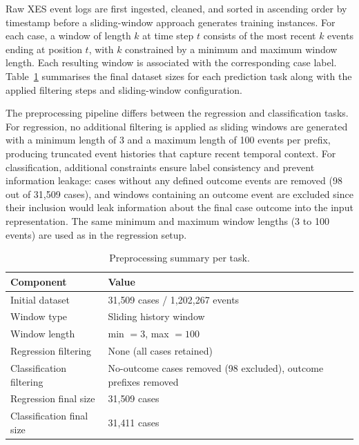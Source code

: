 \documentclass[runningheads]{llncs}
\begin{document}
Raw XES event logs are first ingested, cleaned, and sorted in ascending order by timestamp before a sliding-window approach generates training instances. For each case, a window of length $k$ at time step $t$ consists of the most recent $k$ events ending at position $t$, with $k$ constrained by a minimum and maximum window length. Each resulting window is associated with the corresponding case label. Table~\ref{tab:preprocessing-summary} summarises the final dataset sizes for each prediction task along with the applied filtering steps and sliding-window configuration. 

The preprocessing pipeline differs between the regression and classification tasks. For regression, no additional filtering is applied as sliding windows are generated with a minimum length of 3 and a maximum length of 100 events per prefix, producing truncated event histories that capture recent temporal context. For classification, additional constraints ensure label consistency and prevent information leakage: cases without any defined outcome events are removed (98 out of 31,509 cases), and windows containing an outcome event are excluded since their inclusion would leak information about the final case outcome into the input representation. The same minimum and maximum window lengths (3 to 100 events) are used as in the regression setup.

\begin{table}[t]
    \centering
    \caption{Preprocessing summary per task.}
    \label{tab:preprocessing-summary}
    \begin{tabular}{lp{7cm}}
        \toprule
        Component & Value \\
        \midrule
        Initial dataset            & 31{,}509 cases / 1{,}202{,}267 events \\
        Window type                & Sliding history window \\
        Window length              & min $= 3$, max $= 100$ \\
        Regression filtering       & None (all cases retained) \\
        Classification filtering   & No-outcome cases removed (98 excluded), outcome prefixes removed \\
        Regression final size      & 31{,}509 cases \\
        Classification final size  & 31{,}411 cases \\
        \bottomrule
    \end{tabular}
\end{table}
\end{document}
